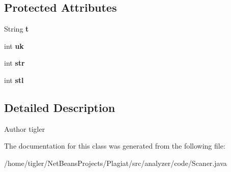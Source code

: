 \subsection*{Protected Attributes}
\begin{DoxyCompactItemize}
\item 
\mbox{\label{classanalyzer_1_1code_1_1Scaner_af22f29cc210b51910a21d62c6b03ea62}} 
String {\bfseries t}
\item 
\mbox{\label{classanalyzer_1_1code_1_1Scaner_ac32aa31f770456bc608c79d1b413560d}} 
int {\bfseries uk}
\item 
\mbox{\label{classanalyzer_1_1code_1_1Scaner_a1c252e1e16eaa8b59aadc78e7d775f45}} 
int {\bfseries str}
\item 
\mbox{\label{classanalyzer_1_1code_1_1Scaner_a64c17378be4c913299fd855b489f3a0a}} 
int {\bfseries stl}
\end{DoxyCompactItemize}


\subsection{Detailed Description}
\begin{DoxyAuthor}{Author}
tigler 
\end{DoxyAuthor}


The documentation for this class was generated from the following file\+:\begin{DoxyCompactItemize}
\item 
/home/tigler/\+Net\+Beans\+Projects/\+Plagiat/src/analyzer/code/Scaner.\+java\end{DoxyCompactItemize}
